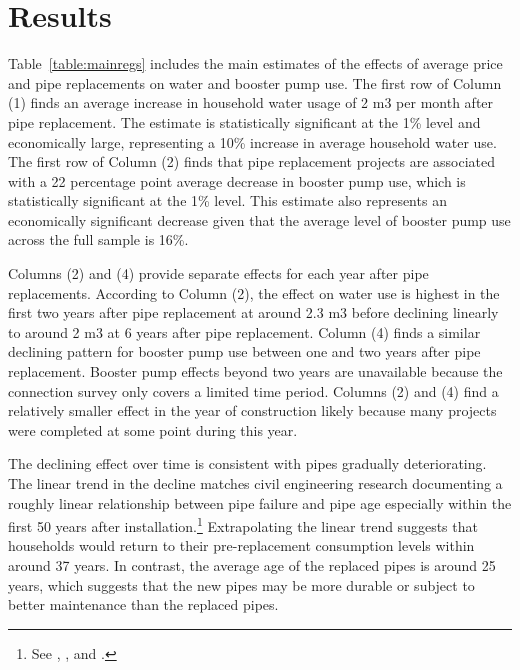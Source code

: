 \documentclass[12pt,table]{article}
\begin{document}
\section{Results}\label{section:results}

Table~\ref{table:mainregs} includes the main estimates of the effects of average price and pipe replacements on water and booster pump use.  The first row of Column (1) finds an average increase in household water usage of 2 m3 per month after pipe replacement.  The estimate is statistically significant at the 1\% level and economically large, representing a 10\% increase in average household water use.  The first row of Column (2) finds that pipe replacement projects are associated with a 22 percentage point average decrease in booster pump use, which is statistically significant at the 1\% level.  This estimate also represents an economically significant decrease given that the average level of booster pump use across the full sample is 16\%. 

Columns (2) and (4) provide separate effects for each year after pipe replacements.  According to Column (2), the effect on water use is highest in the first two years after pipe replacement at around 2.3 m3 before declining linearly to around 2 m3 at 6 years after pipe replacement.  Column (4) finds a similar declining pattern for booster pump use between one and two years after pipe replacement.  Booster pump effects beyond two years are unavailable because the connection survey only covers a limited time period.  Columns (2) and (4) find a relatively smaller effect in the year of construction likely because many projects were completed at some point during this year.

The declining effect over time is consistent with pipes gradually deteriorating.  The linear trend in the decline matches civil engineering research documenting a roughly linear relationship between pipe failure and pipe age especially within the first 50 years after installation.\footnote{See \cite{ward2017deterioration}, \cite{kleiner2001comprehensive}, and \cite{aydogdu2015estimation}.}  Extrapolating the linear trend suggests that households would return to their pre-replacement consumption levels within around 37 years.  In contrast, the average age of the replaced pipes is around 25 years, which suggests that the new pipes may be more durable or subject to better maintenance than the replaced pipes.
\end{document}

